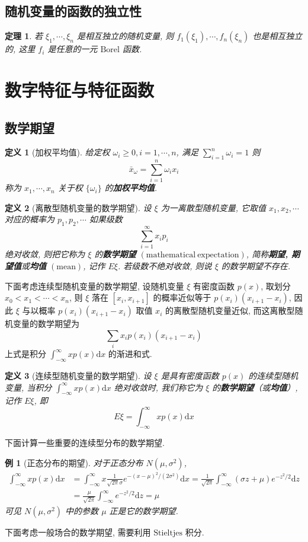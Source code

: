 \documentclass[12pt,a4paper]{article}
\newtheorem{thm}{定理}[subsection]  %
\newtheorem{definition}{定义}[subsection] %
\newtheorem{example}{例}[subsection] %
\begin{document}
\subsection{随机变量的函数的独立性}
\begin{thm}
    若 $\xi_1, \cdots, \xi_n$ 是相互独立的随机变量, 则 $f_1(\xi_1), \cdots, f_n(\xi_n)$ 也是相互独立的, 这里 $f_i$ 是任意的一元 $\mathrm{Borel}$ 函数.
\end{thm}
\newpage

\section{数字特征与特征函数}

\subsection{数学期望}
\begin{definition}[加权平均值]
    给定权 $\omega_i \geq 0, i=1, \cdots, n$, 满足 $\sum\limits_{i=1}^n \omega_i= 1$ 则
    \[\bar{x}_\omega = \sum\limits_{i=1}^n \omega_i x_i\] 称为 $x_1, \cdots, x_n$ 关于权 $\{\omega_i\}$ 的\textbf{加权平均值}.
\end{definition}
\begin{definition}[离散型随机变量的数学期望]
    设 $\xi$ 为一离散型随机变量, 它取值 $x_1, x_2, \cdots$ 对应的概率为 $p_1, p_2, \cdots$ 如果级数
    \[\sum\limits_{i=1}^{\infty} x_i p_i \] 绝对收敛, 则把它称为 $\xi$ 的\textbf{数学期望} $(\mathrm{mathematical\ expectation})$, 
    简称\textbf{期望, 期望值}或\textbf{均值} $(\mathrm{mean})$, 记作 $E\xi$. 若级数不绝对收敛, 则说 $\xi$ 的数学期望不存在.
\end{definition}
下面考虑连续型随机变量的数学期望, 设随机变量 $\xi$ 有密度函数 $p(x)$, 取划分 $x_0<x_1<\cdots<x_n$, 则 $\xi$ 落在
$[x_i, x_{i+1}]$ 的概率近似等于 $p(x_i)(x_{i+1}-x_i)$, 因此 $\xi$ 与以概率 $p(x_i)(x_{i+1}-x_i)$ 取值 $x_i$ 的离散型随机变量近似, 而这离散型随机变量的数学期望为
\[\sum\limits_{i} x_ip(x_i)(x_{i+1}-x_i)\] 上式是积分 $\int_{-\infty}^{\infty} xp(x) \mathrm{d}x$ 的渐进和式.
\begin{definition}[连续型随机变量的数学期望]
    设 $\xi$ 是具有密度函数 $p(x)$ 的连续型随机变量, 当积分 $\int_{-\infty}^{\infty} xp(x) \mathrm{d}x$ 绝对收敛时, 我们称它为 $\xi$ 的\textbf{数学期望}（或\textbf{均值}）, 记作 $E\xi$, 即
    \[ E\xi = \int_{-\infty}^{\infty} xp(x) \mathrm{d}x \]
\end{definition}
下面计算一些重要的连续型分布的数学期望.
\begin{example}[正态分布的期望]
    对于正态分布 $N(\mu, \sigma^2)$,
    \[\begin{aligned}
        \int_{-\infty}^{\infty} xp(x) \mathrm{d}x & = \int_{-\infty}^{\infty} x\frac{1}{\sqrt{2\pi}\sigma} e^{-(x-\mu)^2/(2\sigma^2)} \mathrm{d}x 
        = \frac{1}{\sqrt{2\pi}} \int_{-\infty}^{\infty} (\sigma z + \mu) e^{-z^2 / 2} \mathrm{d}z \\ 
        & = \frac{\mu}{\sqrt{2\pi}} \int_{-\infty}^{\infty} e^{-z^2/2} \mathrm{d}z = \mu
    \end{aligned}\]
    可见 $N(\mu, \sigma^2)$ 中的参数 $\mu$ 正是它的数学期望.
\end{example}
下面考虑一般场合的数学期望, 需要利用 $\mathrm{Stieltjes}$ 积分.
\end{document}
